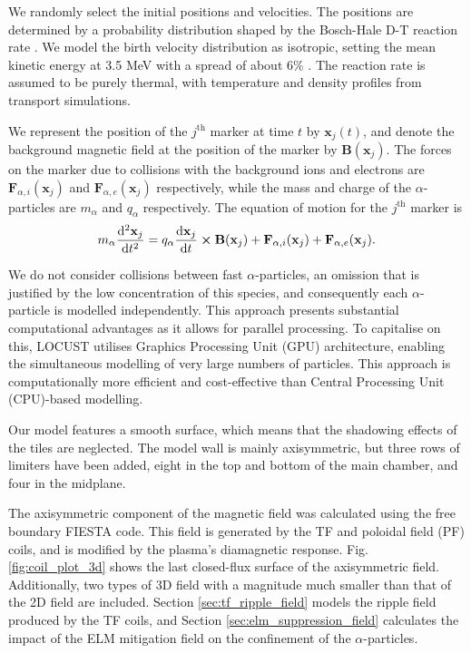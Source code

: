 \documentclass[10pt, a4paper, twoside]{article}
\begin{document}
We randomly select the initial positions and velocities. The positions are determined by a probability distribution shaped by the Bosch-Hale D-T reaction rate \cite{bosch1992}. We model the birth velocity distribution as isotropic, setting the mean kinetic energy at 3.5 MeV with a spread of about 6\% \cite{brysk1973}. The reaction rate is assumed to be purely thermal, with temperature and density profiles from transport simulations.

We represent the position of the $j^{\text{th}}$ marker at time $t$ by $\mathbf{x}_j(t)$, and denote
the background magnetic field at the position of the marker by $\textbf{B}(\mathbf{x}_j)$.
The forces on the marker due to collisions with the background ions and electrons are $\textbf{F}_{\alpha,i}(\mathbf{x}_j)$ and $\textbf{F}_{\alpha,e}(\mathbf{x}_j)$ respectively, while the mass and charge of the $\alpha$-particles are $m_\alpha$ and $q_\alpha$ respectively. The equation of motion for the $j^{\text{th}}$ marker is
\begin{equation}
m_\alpha\dv[2]{\mathbf{x}_j}{t} = q_\alpha\dv{\mathbf{x}_j}{t}\cross\textbf{B}(\mathbf{x}_j) + \textbf{F}_{\alpha,i}(\mathbf{x}_j) + \textbf{F}_{\alpha,e}(\mathbf{x}_j).
\end{equation}

We do not consider collisions between fast $\alpha$-particles, an omission that is justified by the low concentration of this species, and consequently each $\alpha$-particle is modelled independently. This approach presents substantial computational advantages as it allows for parallel processing. To capitalise on this, LOCUST utilises Graphics Processing Unit (GPU) architecture, enabling the simultaneous modelling of very large numbers of particles. This approach is computationally more efficient and cost-effective than Central Processing Unit (CPU)-based modelling. 

Our model features a smooth surface, which means that the shadowing effects of the tiles are neglected. The model wall is mainly axisymmetric, but three rows of limiters have been added, eight in the top and bottom of the main chamber, and four in the midplane. 

The axisymmetric component of the magnetic field was calculated using the free boundary FIESTA code. This field is generated by the TF and poloidal field (PF) coils, and is modified by the plasma's diamagnetic response. Fig. \ref{fig:coil_plot_3d} shows the last closed-flux surface of the axisymmetric field. Additionally, two types of 3D field with a magnitude much smaller than that of the 2D field are included. Section \ref{sec:tf_ripple_field} models the ripple field produced by the TF coils, and Section \ref{sec:elm_suppression_field} calculates the impact of the ELM mitigation field on the confinement of the $\alpha$-particles.
\end{document}
